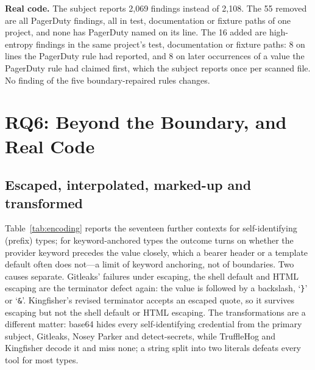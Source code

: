 \documentclass[10pt,journal,compsoc]{IEEEtran}
\begin{document}
\textbf{Real code.} The subject reports 2{,}069 findings instead of 2{,}108. The 55 removed are all PagerDuty findings, all in test, documentation or fixture paths of one project, and none has PagerDuty named on its line. The 16 added are high-entropy findings in the same project's test, documentation or fixture paths: 8 on lines the PagerDuty rule had reported, and 8 on later occurrences of a value the PagerDuty rule had claimed first, which the subject reports once per scanned file. No finding of the five boundary-repaired rules changes.

\section{RQ6: Beyond the Boundary, and Real Code}
\label{sec:rq6}

\subsection{Escaped, interpolated, marked-up and transformed}

Table~\ref{tab:encoding} reports the seventeen further contexts for self-identifying (prefix) types; for keyword-anchored types the outcome turns on whether the provider keyword precedes the value closely, which a bearer header or a template default often does not---a limit of keyword anchoring, not of boundaries. Two causes separate. Gitleaks' failures under escaping, the shell default and HTML escaping are the terminator defect again: the value is followed by a backslash, `\texttt{\}}' or `\texttt{\&}'. Kingfisher's revised terminator accepts an escaped quote, so it survives escaping but not the shell default or HTML escaping. The transformations are a different matter: base64 hides every self-identifying credential from the primary subject, Gitleaks, Nosey Parker and detect-secrets, while TruffleHog and Kingfisher decode it and miss none; a string split into two literals defeats every tool for most types.
\end{document}
